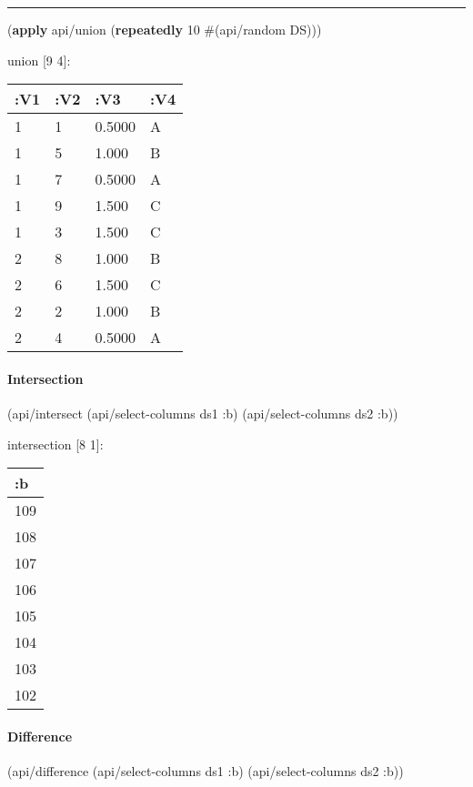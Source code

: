 \documentclass[]{article}
\newenvironment{Shaded}{\begin{snugshade}}{\end{snugshade}}
\newcommand{\KeywordTok}[1]{\textcolor[rgb]{0.13,0.29,0.53}{\textbf{#1}}}
\newcommand{\DecValTok}[1]{\textcolor[rgb]{0.00,0.00,0.81}{#1}}
\newcommand{\AttributeTok}[1]{\textcolor[rgb]{0.77,0.63,0.00}{#1}}
\newcommand{\NormalTok}[1]{#1}
\let\oldparagraph\paragraph
\renewcommand{\paragraph}[1]{\oldparagraph{#1}\mbox{}}
\begin{document}
\begin{center}\rule{0.5\linewidth}{0.5pt}\end{center}

\begin{Shaded}
\begin{Highlighting}[]
\NormalTok{(}\KeywordTok{apply}\NormalTok{ api/union (}\KeywordTok{repeatedly} \DecValTok{10}\NormalTok{ #(api/random DS)))}
\end{Highlighting}
\end{Shaded}

union {[}9 4{]}:

\begin{longtable}[]{@{}llll@{}}
\toprule
:V1 & :V2 & :V3 & :V4\tabularnewline
\midrule
\endhead
1 & 1 & 0.5000 & A\tabularnewline
1 & 5 & 1.000 & B\tabularnewline
1 & 7 & 0.5000 & A\tabularnewline
1 & 9 & 1.500 & C\tabularnewline
1 & 3 & 1.500 & C\tabularnewline
2 & 8 & 1.000 & B\tabularnewline
2 & 6 & 1.500 & C\tabularnewline
2 & 2 & 1.000 & B\tabularnewline
2 & 4 & 0.5000 & A\tabularnewline
\bottomrule
\end{longtable}

\paragraph{Intersection}\label{intersection}

\begin{Shaded}
\begin{Highlighting}[]
\NormalTok{(api/intersect (api/select-columns ds1 }\AttributeTok{:b}\NormalTok{)}
\NormalTok{               (api/select-columns ds2 }\AttributeTok{:b}\NormalTok{))}
\end{Highlighting}
\end{Shaded}

intersection {[}8 1{]}:

\begin{longtable}[]{@{}l@{}}
\toprule
:b\tabularnewline
\midrule
\endhead
109\tabularnewline
108\tabularnewline
107\tabularnewline
106\tabularnewline
105\tabularnewline
104\tabularnewline
103\tabularnewline
102\tabularnewline
\bottomrule
\end{longtable}

\paragraph{Difference}\label{difference}

\begin{Shaded}
\begin{Highlighting}[]
\NormalTok{(api/difference (api/select-columns ds1 }\AttributeTok{:b}\NormalTok{)}
\NormalTok{                (api/select-columns ds2 }\AttributeTok{:b}\NormalTok{))}
\end{Highlighting}
\end{Shaded}
\end{document}
